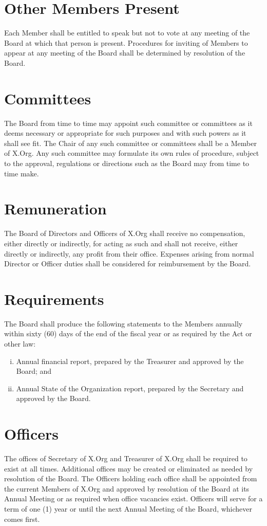 \documentclass[10pt, english]{xorgdocs}
\begin{document}
\section{Other Members Present}
Each Member shall be entitled to speak but not to vote at any meeting of the
Board at which that person is present. Procedures for inviting of Members to
appear at any meeting of the Board shall be determined by resolution of the
Board.

\section{Committees}
The Board from time to time may appoint such committee or committees as it deems
necessary or appropriate for such purposes and with such powers as it shall see
fit. The Chair of any such committee or committees shall be a Member of X.Org.
Any such committee may formulate its own rules of procedure, subject to the
approval, regulations or directions such as the Board may from time to time
make.

\section{Remuneration}
The Board of Directors and Officers of X.Org shall receive no compensation,
either directly or indirectly, for acting as such and shall not receive, either
directly or indirectly, any profit from their office. Expenses arising from
normal Director or Officer duties shall be considered for reimbursement by the
Board.

\section{Requirements}
The Board shall produce the following statements to the Members annually within
sixty (60) days of the end of the fiscal year or as required by the Act or
other law:

\begin{enumerate}[(i)\hspace{.2cm}]
	\item Annual financial report, prepared by the Treasurer and approved by
	the Board; and

	\item Annual State of the Organization report, prepared by the Secretary
	and approved by the Board.
\end{enumerate}

\section{Officers}
The offices of Secretary of X.Org and Treasurer of X.Org shall be required
to exist at all times.  Additional offices may be created or eliminated as
needed by resolution of the Board.  The Officers holding each office shall be
appointed from the current Members of X.Org and approved by resolution of the
Board at its Annual Meeting or as required when office vacancies exist.
Officers will serve for a term of one (1) year or until the next Annual Meeting
of the Board, whichever comes first.
\end{document}
